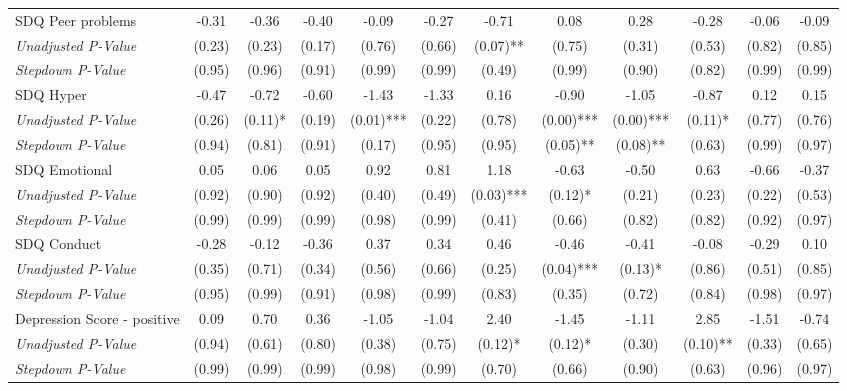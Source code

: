 \begin{tabular}{l c c c c c c c c c c c}
SDQ Peer problems & -0.31 & -0.36 & -0.40 & -0.09 & -0.27 & -0.71 & 0.08 & 0.28 & -0.28 & -0.06 & -0.09 \\
\quad \textit{Unadjusted P-Value} & (0.23) & (0.23) & (0.17) & (0.76) & (0.66) & (0.07)** & (0.75) & (0.31) & (0.53) & (0.82) & (0.85) \\
\quad \textit{Stepdown P-Value} & (0.95) & (0.96) & (0.91) & (0.99) & (0.99) & (0.49) & (0.99) & (0.90) & (0.82) & (0.99) & (0.99) \\
SDQ Hyper & -0.47 & -0.72 & -0.60 & -1.43 & -1.33 & 0.16 & -0.90 & -1.05 & -0.87 & 0.12 & 0.15 \\
\quad \textit{Unadjusted P-Value} & (0.26) & (0.11)* & (0.19) & (0.01)*** & (0.22) & (0.78) & (0.00)*** & (0.00)*** & (0.11)* & (0.77) & (0.76) \\
\quad \textit{Stepdown P-Value} & (0.94) & (0.81) & (0.91) & (0.17) & (0.95) & (0.95) & (0.05)** & (0.08)** & (0.63) & (0.99) & (0.97) \\
SDQ Emotional & 0.05 & 0.06 & 0.05 & 0.92 & 0.81 & 1.18 & -0.63 & -0.50 & 0.63 & -0.66 & -0.37 \\
\quad \textit{Unadjusted P-Value} & (0.92) & (0.90) & (0.92) & (0.40) & (0.49) & (0.03)*** & (0.12)* & (0.21) & (0.23) & (0.22) & (0.53) \\
\quad \textit{Stepdown P-Value} & (0.99) & (0.99) & (0.99) & (0.98) & (0.99) & (0.41) & (0.66) & (0.82) & (0.82) & (0.92) & (0.97) \\
SDQ Conduct & -0.28 & -0.12 & -0.36 & 0.37 & 0.34 & 0.46 & -0.46 & -0.41 & -0.08 & -0.29 & 0.10 \\
\quad \textit{Unadjusted P-Value} & (0.35) & (0.71) & (0.34) & (0.56) & (0.66) & (0.25) & (0.04)*** & (0.13)* & (0.86) & (0.51) & (0.85) \\
\quad \textit{Stepdown P-Value} & (0.95) & (0.99) & (0.91) & (0.98) & (0.99) & (0.83) & (0.35) & (0.72) & (0.84) & (0.98) & (0.97) \\
Depression Score - positive & 0.09 & 0.70 & 0.36 & -1.05 & -1.04 & 2.40 & -1.45 & -1.11 & 2.85 & -1.51 & -0.74 \\
\quad \textit{Unadjusted P-Value} & (0.94) & (0.61) & (0.80) & (0.38) & (0.75) & (0.12)* & (0.12)* & (0.30) & (0.10)** & (0.33) & (0.65) \\
\quad \textit{Stepdown P-Value} & (0.99) & (0.99) & (0.99) & (0.98) & (0.99) & (0.70) & (0.66) & (0.90) & (0.63) & (0.96) & (0.97) \\
\bottomrule
\end{tabular}
